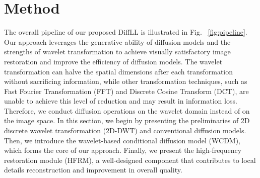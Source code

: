 \section{Method}\label{sec:method}
The overall pipeline of our proposed DiffLL is illustrated in Fig. ~\ref{fig:pipeline}. Our approach leverages the generative ability of diffusion models and the strengths of wavelet transformation to achieve visually satisfactory image restoration and improve the efficiency of diffusion models. The wavelet transformation can halve the spatial dimensions after each transformation without sacrificing information, while other transformation techniques, such as Fast Fourier Transformation (FFT) and Discrete Cosine Transform (DCT), are unable to achieve this level of reduction and may result in information loss. Therefore, we conduct diffusion operations on the wavelet domain instead of on the image space. In this section, we begin by presenting the preliminaries of 2D discrete wavelet transformation (2D-DWT) and conventional diffusion models. Then, we introduce the wavelet-based conditional diffusion model (WCDM), which forms the core of our approach. Finally, we present the high-frequency restoration module (HFRM), a well-designed component that contributes to local details reconstruction and improvement in overall quality.
